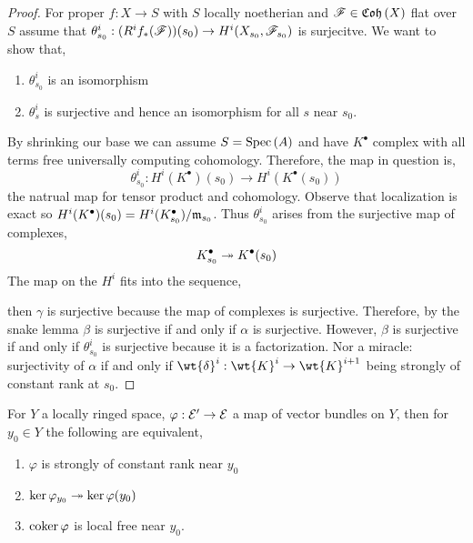 \documentclass[12pt]{article}
\begin{document}
\begin{proof}
For proper $f : X \to S$ with $S$ locally noetherian and $\mathscr{F} \in \mathfrak{Coh}\left(X\right)$ flat over $S$ assume that $\theta^i_{s_0} : (R^i f_* (\mathscr{F}))(s_0) \to H^i(X_{s_0}, \mathscr{F}_{s_0})$ is surjecitve. We want to show that,
\begin{enumerate}
\item $\theta^i_{s_0}$ is an isomorphism
\item $\theta^i_s$ is surjective and hence an isomorphism for all $s$ near $s_0$.
\end{enumerate}
By shrinking our base we can assume $S = \mathrm{Spec}\left( A \right)$ and have $K^\bullet$ complex with all terms free universally computing cohomology. Therefore, the map in question is,
\[ \theta^i_{s_0} : H^i(K^\bullet)(s_0) \to H^i(K^\bullet(s_0)) \]
the natrual map for tensor product and cohomology. Observe that localization is exact so $H^i(K^\bullet)(s_0) = H^i(K^\bullet_{s_0}) / \mathfrak{m}_{s_0}$. Thus $\theta^i_{s_0}$ arises from the surjective map of complexes,
\[ K^\bullet_{s_0} \twoheadrightarrow K^\bullet(s_0) \]
The map on the $H^i$ fits into the sequence,
\begin{center}
\end{center}
then $\gamma$ is surjective because the map of complexes is surjective. Therefore, by the snake lemma $\beta$ is surjective if and only if $\alpha$ is surjective. However, $\beta$ is surjective if and only if $\theta^i_{s_0}$ is surjective because it is a factorization. Nor a miracle: surjectivity of $\alpha$ if and only if $\wt{\delta}^i : \wt{K}^i \to \wt{K}^{i+1}$ being strongly of constant rank at $s_0$. 
\end{proof}

\begin{lemma}
For $Y$ a locally ringed space, $\varphi : \mathcal{E}' \to \mathcal{E}$ a map of vector bundles on $Y$, then for $y_0 \in Y$ the following are equivalent,
\begin{enumerate}
\item $\varphi$ is strongly of constant rank near $y_0$
\item $\ker{\varphi_{y_0}} \twoheadrightarrow \ker{\varphi(y_0)}$
\item $\operatorname{\mathrm{coker}}{\varphi}$ is local free near $y_0$.
\end{enumerate}
\end{lemma}
\end{document}
